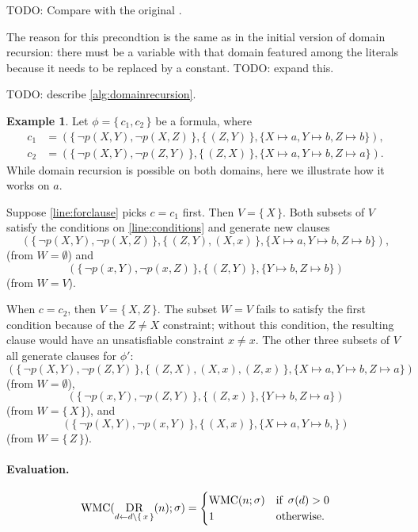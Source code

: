 \documentclass{article}
\theoremstyle{definition}
\newtheorem{example}{Example}
\theoremstyle{remark}
\DeclareMathOperator{\DR}{\textsc{DR}}
\DeclareMathOperator{\size}{\sigma}
\DeclareMathOperator{\WMC}{WMC}
\begin{document}
TODO: Compare with the original \cite{DBLP:conf/nips/Broeck11}.

The reason for this precondtion is the same as in the initial version of domain recursion: there must be a variable with that domain featured among the literals because it needs to be replaced by a constant. TODO: expand this.

TODO: describe \cref{alg:domainrecursion}.

\begin{example}
  Let $\phi = \{\, c_1, c_2 \,\}$ be a formula, where
  \begin{align*}
    c_1 &= (\{\, \neg p(X, Y), \neg p(X, Z) \,\}, \{\, (Z, Y) \,\}, \{ X \mapsto a, Y \mapsto b, Z \mapsto b \}), \\
    c_2 &= (\{\, \neg p(X, Y), \neg p(Z, Y) \,\}, \{\, (Z, X) \,\}, \{ X \mapsto a, Y \mapsto b, Z \mapsto a \}).
  \end{align*}
  While domain recursion is possible on both domains, here we illustrate how it works on $a$.

  Suppose \cref{line:forclause} picks $c = c_1$ first. Then $V = \{\, X \,\}$. Both subsets of $V$ satisfy the conditions on \cref{line:conditions} and generate new clauses
  \[
  (\{\, \neg p(X, Y), \neg p(X, Z) \,\}, \{\, (Z, Y), (X, x) \,\}, \{ X \mapsto a, Y \mapsto b, Z \mapsto b \}),
  \]
  (from $W = \emptyset$) and
  \[
  (\{\, \neg p(x, Y), \neg p(x, Z) \,\}, \{\, (Z, Y) \,\}, \{ Y \mapsto b, Z \mapsto b \})
  \]
  (from $W = V$).

  When $c = c_2$, then $V = \{\, X, Z \,\}$. The subset $W = V$ fails to satisfy the first condition because of the $Z \ne X$ constraint; without this condition, the resulting clause would have an unsatisfiable constraint $x \ne x$. The other three subsets of $V$ all generate clauses for $\phi'$:
  \[
  (\{\, \neg p(X, Y), \neg p(Z, Y) \,\}, \{\, (Z, X), (X, x), (Z, x) \,\}, \{ X \mapsto a, Y \mapsto b, Z \mapsto a \})
  \]
  (from $W = \emptyset$),
  \[
  (\{\, \neg p(x, Y), \neg p(Z, Y) \,\}, \{\, (Z, x) \,\}, \{ Y \mapsto b, Z \mapsto a \})
  \]
  (from $W = \{\, X \,\}$), and
  \[
  (\{\, \neg p(X, Y), \neg p(x, Y) \,\}, \{\, (X, x) \,\}, \{ X \mapsto a, Y \mapsto b, \})
  \]
  (from $W = \{\, Z \,\}$).
\end{example}

\paragraph{Evaluation.}
\[
\WMC(\DR_{d \gets d \setminus \{\, x \,\}}(n); \size) =
\begin{cases}
  \WMC(n; \size) & \text{if } \size(d) > 0 \\
  1 & \text{otherwise.}
\end{cases}
\]
\end{document}

